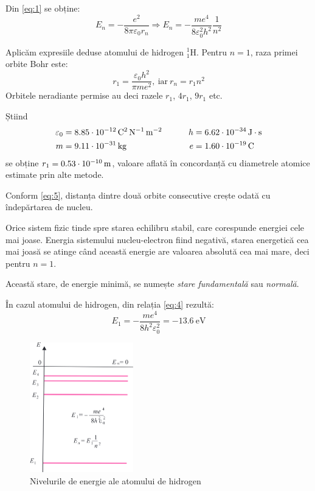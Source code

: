 Din \eqref{eq:1} se obține:
\begin{equation}
    E_n = -\frac{e^2}{8\pi\varepsilon_0 r_n}
    \Rightarrow \boxed{E_n = -\frac{me^4}{8\varepsilon_0^2 h^2} \frac{1}{n^2}}
    \label{eq:4}
\end{equation}

Aplicăm expresiile deduse atomului de hidrogen $^1_1$H.
Pentru $n = 1$, raza primei orbite Bohr este:
\begin{equation}
    r_1 = \frac{\varepsilon_0 h^2}{\pi m e^2}, ~\text{iar}~ r_n = r_1n^2
    \label{eq:5}
\end{equation}
Orbitele neradiante permise au deci razele $r_1$, $4r_1$, $9r_1$ etc.

Știind
\begin{align*}
    \varepsilon_0 &= \SI{8,85d-12}{\coulomb\tothe{2}\per\newton\per\metre\tothe{2}}
    \hspace{0.75cm}
    &h &= \SI{6,62d-34}{\joule\cdot\second}
    \\
    m &= \SI{9,11d-31}{\kilogram}
    \hspace{0.75cm}
    &e &=\SI{1,60d-19}{\coulomb}
\end{align*}
se obține \( r_1 = \SI{0,53d-10}{\metre} \), valoare aflată în concordanță cu
diametrele atomice estimate prin alte metode.

Conform \eqref{eq:5}, distanța dintre două orbite consecutive crește odată cu
îndepărtarea de nucleu.

Orice sistem fizic tinde spre starea echilibru stabil, care corespunde energiei
cele mai joase. Energia sistemului nucleu-electron fiind negativă, starea
energetică cea mai joasă se atinge când această energie are valoarea absolută
cea mai mare, deci pentru $n = 1$.

Această stare, de energie minimă, se numește \emph{stare fundamentală} sau
\emph{normală}.

În cazul atomului de hidrogen, din relația \eqref{eq:4} rezultă:
\[ E_1 = -\frac{me^4}{8h^2\varepsilon_0^2} = \SI{-13,6}{\electronvolt} \]

\begin{figure}
    \centering
    \includegraphics[width=0.4\textwidth]{fig/niveluri_energie_hidrogen}
    \caption{Nivelurile de energie ale atomului de hidrogen}
\end{figure}

